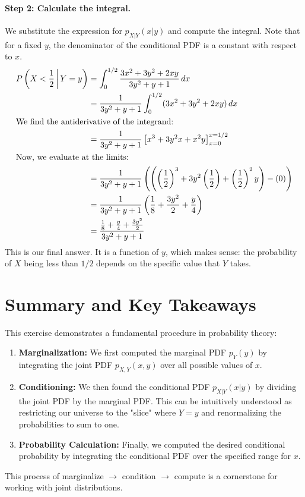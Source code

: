 \documentclass[11pt,a4paper]{article}
\begin{document}
\paragraph{Step 2: Calculate the integral.}
We substitute the expression for $p_{X|Y}(x|y)$ and compute the integral. Note that for a fixed $y$, the denominator of the conditional PDF is a constant with respect to $x$.
\begin{align*}
P\left(X < \frac{1}{2} \, \middle| \, Y=y\right) &= \int_{0}^{1/2} \frac{3x^2 + 3y^2 + 2xy}{3y^2 + y + 1} \,dx \\
&= \frac{1}{3y^2 + y + 1} \int_{0}^{1/2} (3x^2 + 3y^2 + 2xy) \,dx \\
\intertext{We find the antiderivative of the integrand:}
&= \frac{1}{3y^2 + y + 1} \left[ x^3 + 3y^2x + x^2y \right]_{x=0}^{x=1/2} \\
\intertext{Now, we evaluate at the limits:}
&= \frac{1}{3y^2 + y + 1} \left( \left( \left(\frac{1}{2}\right)^3 + 3y^2\left(\frac{1}{2}\right) + \left(\frac{1}{2}\right)^2y \right) - (0) \right) \\
&= \frac{1}{3y^2 + y + 1} \left( \frac{1}{8} + \frac{3y^2}{2} + \frac{y}{4} \right) \\
&= \frac{\frac{1}{8} + \frac{y}{4} + \frac{3y^2}{2}}{3y^2 + y + 1}
\end{align*}
This is our final answer. It is a function of $y$, which makes sense: the probability of $X$ being less than $1/2$ depends on the specific value that $Y$ takes.

\section{Summary and Key Takeaways}
This exercise demonstrates a fundamental procedure in probability theory:
\begin{enumerate}
    \item \textbf{Marginalization:} We first computed the marginal PDF $p_Y(y)$ by integrating the joint PDF $p_{X,Y}(x,y)$ over all possible values of $x$.
    \item \textbf{Conditioning:} We then found the conditional PDF $p_{X|Y}(x|y)$ by dividing the joint PDF by the marginal PDF. This can be intuitively understood as restricting our universe to the "slice" where $Y=y$ and renormalizing the probabilities to sum to one.
    \item \textbf{Probability Calculation:} Finally, we computed the desired conditional probability by integrating the conditional PDF over the specified range for $x$.
\end{enumerate}
This process of marginalize $\to$ condition $\to$ compute is a cornerstone for working with joint distributions.
\end{document}
